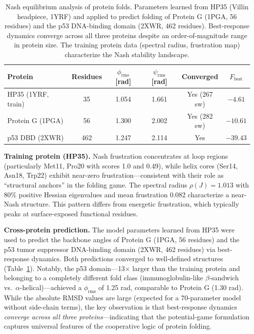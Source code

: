 \documentclass[12pt,a4paper]{article}
\theoremstyle{remark}
\begin{document}
\begin{table}[ht]
\centering
\caption{Nash equilibrium analysis of protein folds. Parameters learned from HP35 (Villin headpiece, 1YRF) and applied to predict folding of Protein G (1PGA, 56 residues) and the p53 DNA-binding domain (2XWR, 462 residues). Best-response dynamics converge across all three proteins despite an order-of-magnitude range in protein size. The training protein data (spectral radius, frustration map) characterize the Nash stability landscape.}
\label{tab:nash-results}
\begin{tabular}{lccccc}
\toprule
\textbf{Protein} & \textbf{Residues} & $\phi_{\text{rms}}$ [rad] & $\psi_{\text{rms}}$ [rad] & \textbf{Converged} & $F_{\text{best}}$ \\
\midrule
HP35 (1YRF, train) & 35 & 1.054 & 1.661 & Yes (267 sw) & $-4.61$ \\
Protein G (1PGA) & 56 & 1.300 & 2.002 & Yes (282 sw) & $-10.61$ \\
p53 DBD (2XWR) & 462 & 1.247 & 2.114 & Yes & $-39.43$ \\
\bottomrule
\end{tabular}
\end{table}

\textbf{Training protein (HP35).} Nash frustration concentrates at loop regions (particularly Met11, Pro20 with scores 1.0 and 0.49), while helix cores (Ser14, Asn18, Trp22) exhibit near-zero frustration---consistent with their role as ``structural anchors'' in the folding game. The spectral radius $\rho(J) = 1.013$ with 80\% positive Hessian eigenvalues and mean frustration 0.082 characterize a near-Nash structure. This pattern differs from energetic frustration, which typically peaks at surface-exposed functional residues.

\textbf{Cross-protein prediction.} The model parameters learned from HP35 were used to predict the backbone angles of Protein G (1PGA, 56 residues) and the p53 tumor suppressor DNA-binding domain (2XWR, 462 residues) via best-response dynamics. Both predictions converged to well-defined structures (Table~\ref{tab:nash-results}). Notably, the p53 domain---13$\times$ larger than the training protein and belonging to a completely different fold class (immunoglobulin-like $\beta$-sandwich vs.\ $\alpha$-helical)---achieved a $\phi_{\text{rms}}$ of 1.25 rad, comparable to Protein G (1.30 rad). While the absolute RMSD values are large (expected for a 70-parameter model without side-chain terms), the key observation is that best-response dynamics \emph{converge across all three proteins}---indicating that the potential-game formulation captures universal features of the cooperative logic of protein folding.
\end{document}
